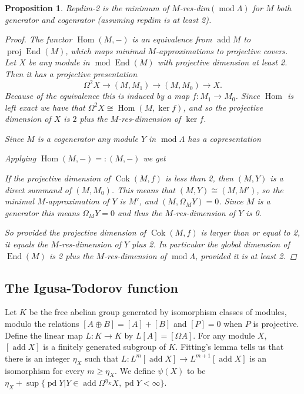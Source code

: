 \documentclass[11pt, a4paper, english]{article}
\newtheorem{prop}[theorem]{Proposition}
\theoremstyle{definition}
\DeclareMathOperator{\Hom}{Hom}
\DeclareMathOperator{\End}{End}
\DeclareMathOperator{\cok}{Cok}
\DeclareMathOperator{\proj}{proj}
\DeclareMathOperator{\pd}{pd}
\DeclareMathOperator{\add}{add}
\def\mod{\operatorname{mod}}
\begin{document}
\begin{prop}
	Repdim-2 is the minimum of $M$-res-dim$(\mod \Lambda)$ for $M$ both generator and cogenrator (assuming repdim is at least 2).
	
	\begin{proof}
		The functor $\Hom(M, -)$ is an equivalence from $\add M$ to $\proj\End(M)$, which maps minimal $M$-approximations to projective covers. Let $X$ be any module in $\mod\End(M)$ with projective dimension at least 2. Then it has a projective presentation $$\Omega^2X \to (M,M_1) \to (M,M_0) \to X.$$
		Because of the equivalence this is induced by a map $f:M_1\to M_0$. Since $\Hom$ is left exact we have that $\Omega^2X \cong \Hom(M, \ker f)$, and so the projective dimension of $X$ is $2$ plus the $M$-res-dimension of $\ker f$.
		
		Since $M$ is a cogenerator any module $Y$ in $\mod\Lambda$ has a copresentation 
		\begin{center}
		\end{center}
		Applying $\Hom(M,-) =: (M,-)$ we get
		\begin{center}
		\end{center}
		If the projective dimension of $\cok(M,f)$ is less than 2, then $(M, Y)$ is a direct summand of $(M, M_0)$. This means that $(M,Y) \cong (M, M')$, so the minimal $M$-approximation of $Y$ is $M'$, and $(M, \Omega_M Y) = 0$. Since $M$ is a generator this means $\Omega_M Y = 0$ and thus the $M$-res-dimension of $Y$ is 0.
		
		So provided the projective dimension of $\cok(M,f)$ is larger than or equal to 2, it equals the $M$-res-dimension of $Y$ plus 2. In particular the global dimension of $\End(M)$ is 2 plus the $M$-res-dimension of $\mod\Lambda$, provided it is at least 2.
	\end{proof}
\end{prop}

\subsection{The Igusa-Todorov function} \label{sec:Igusa-Todorov}
Let $K$ be the free abelian group generated by isomorphism classes of modules, modulo the relations $[A\oplus B] = [A] + [B]$ and $[P]=0$ when $P$ is projective. Define the linear map $L:K\to K$ by $L[A] = [\Omega A]$. For any module $X$, $[\add X]$ is a finitely generated subgroup of $K$. Fitting's lemma tells us that there is an integer $\eta_X$ such that $L:L^m[\add X] \to L^{m+1}[\add X]$ is an isomorphism for every $m \geq \eta_X$. We define $\psi(X)$ to be $\eta_X + \sup\{\pd Y | Y \in \add \Omega^{\eta_X}X, \pd Y<\infty\}$.
\end{document}
